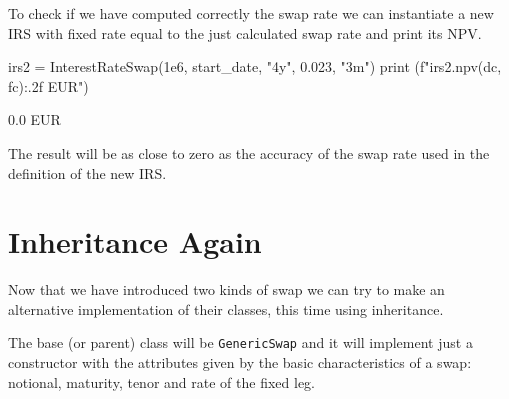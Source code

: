 To check if we have computed correctly the swap rate we can instantiate a new IRS with fixed rate equal to the just calculated swap rate and print its NPV.

\begin{ipython}
irs2 = InterestRateSwap(1e6, start_date, "4y", 0.023, "3m")
print (f"{irs2.npv(dc, fc):.2f} EUR")
\end{ipython}
\begin{ioutput}
0.0 EUR
\end{ioutput}
\noindent
The result will be as close to zero as the accuracy of the swap rate used in the definition of the new IRS.
   
\section{Inheritance Again}
\begin{finmarkets}
Now that we have introduced two kinds of swap we can try to make an alternative implementation of their classes, this time using inheritance.

The base (or parent) class will be \texttt{GenericSwap} and it will implement just a constructor with the attributes given by the basic characteristics of a swap: notional, maturity, tenor and rate of the fixed leg.
\end{finmarkets}


